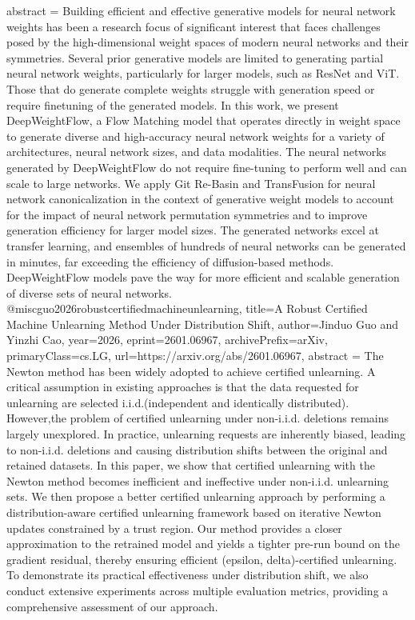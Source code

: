 {      abstract = {Building efficient and effective generative models for neural network weights has been a research focus of significant interest that faces challenges posed by the high-dimensional weight spaces of modern neural networks and their symmetries. Several prior generative models are limited to generating partial neural network weights, particularly for larger models, such as ResNet and ViT. Those that do generate complete weights struggle with generation speed or require finetuning of the generated models. In this work, we present DeepWeightFlow, a Flow Matching model that operates directly in weight space to generate diverse and high-accuracy neural network weights for a variety of architectures, neural network sizes, and data modalities. The neural networks generated by DeepWeightFlow do not require fine-tuning to perform well and can scale to large networks. We apply Git Re-Basin and TransFusion for neural network canonicalization in the context of generative weight models to account for the impact of neural network permutation symmetries and to improve generation efficiency for larger model sizes. The generated networks excel at transfer learning, and ensembles of hundreds of neural networks can be generated in minutes, far exceeding the efficiency of diffusion-based methods. DeepWeightFlow models pave the way for more efficient and scalable generation of diverse sets of neural networks.}
}@misc{guo2026robustcertifiedmachineunlearning,
      title={A Robust Certified Machine Unlearning Method Under Distribution Shift}, 
      author={Jinduo Guo and Yinzhi Cao},
      year={2026},
      eprint={2601.06967},
      archivePrefix={arXiv},
      primaryClass={cs.LG},
      url={https://arxiv.org/abs/2601.06967},
      abstract = {The Newton method has been widely adopted to achieve certified unlearning. A critical assumption in existing approaches is that the data requested for unlearning are selected i.i.d.(independent and identically distributed). However,the problem of certified unlearning under non-i.i.d. deletions remains largely unexplored. In practice, unlearning requests are inherently biased, leading to non-i.i.d. deletions and causing distribution shifts between the original and retained datasets. In this paper, we show that certified unlearning with the Newton method becomes inefficient and ineffective under non-i.i.d. unlearning sets. We then propose a better certified unlearning approach by performing a distribution-aware certified unlearning framework based on iterative Newton updates constrained by a trust region. Our method provides a closer approximation to the retrained model and yields a tighter pre-run bound on the gradient residual, thereby ensuring efficient (epsilon, delta)-certified unlearning. To demonstrate its practical effectiveness under distribution shift, we also conduct extensive experiments across multiple evaluation metrics, providing a comprehensive assessment of our approach.}
}
